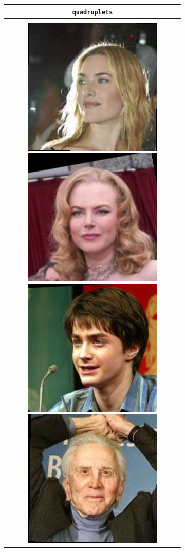 \documentclass[twoside,11pt]{article}
\begin{document}
\begin{figure}[H]
\begin{subfigure}[t]{0.3\textwidth}
          \begin{tabular}{c}
     \texttt{quadruplets} \\ \hline \\
     \includegraphics[scale=0.15]{Kate_Winslet_0001.jpg} \includegraphics[scale=0.15]{Nicole_Kidman_0001.jpg} \includegraphics[scale=0.15]{Daniel_Radcliffe_0001.jpg} \includegraphics[scale=0.15]{Kirk_Douglas_0001.jpg} \\

\end{tabular}
\end{subfigure}
\end{figure}
\end{document}
